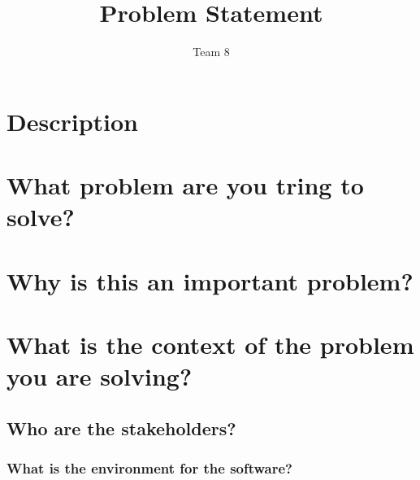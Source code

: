 \documentclass[12pt]{article}
\title{Problem Statement}
\author{Team 8}
\begin{document}
\maketitle

\section {Description}

\section {What problem are you tring to solve?}

\section {Why is this an important problem?}

\section {What is the context of the problem you are solving?}
\subsection {Who are the stakeholders?}
\subsubsection {What is the environment for the software?}
\end{document}
